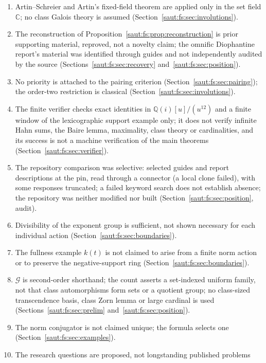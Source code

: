 \documentclass[11pt]{article}
\theoremstyle{definition}
\theoremstyle{remark}
\newcommand{\C}{\mathbb C}
\newcommand{\Q}{\mathbb Q}
\numberwithin{equation}{section}
\begin{document}
\begin{enumerate}[label=\arabic*.,leftmargin=2.2em]
field only for Archimedean coefficients; Proposition~\ref{saut:fs:prop:residue} is not
stated in general (Section~\ref{saut:fs:sec:integerparts}).
\item Artin--Schreier and Artin's fixed-field theorem are applied only in the set field
$\C$; no class Galois theory is assumed (Section~\ref{saut:fs:sec:involutions}).
\item The reconstruction of Proposition~\ref{saut:fs:prop:reconstruction} is prior
supporting material, reproved, not a novelty claim; the omnific Diophantine report's
material was identified through guides and not independently audited by the source
(Sections~\ref{saut:fs:sec:recovery} and~\ref{saut:fs:sec:position}).
\item No priority is attached to the pairing criterion
(Section~\ref{saut:fs:sec:pairing}); the order-two restriction is classical
(Section~\ref{saut:fs:sec:involutions}).
\item The finite verifier checks exact identities in $\Q(i)[u]/(u^{12})$ and a finite
window of the lexicographic support example only; it does not verify infinite Hahn
sums, the Baire lemma, maximality, class theory or cardinalities, and its success is
not a machine verification of the main theorems (Section~\ref{saut:fs:sec:verifier}).
\item The repository comparison was selective: selected guides and report
descriptions at the pin, read through a connector (a local clone failed), with some
responses truncated; a failed keyword search does not establish absence; the
repository was neither modified nor built (Section~\ref{saut:fs:sec:position}, audit).
\item Divisibility of the exponent group is sufficient, not shown necessary for each
individual action (Section~\ref{saut:fs:sec:boundaries}).
\item The fullness example $k(t)$ is not claimed to arise from a finite norm action or
to preserve the negative-support ring (Section~\ref{saut:fs:sec:boundaries}).
\item $\mathcal G$ is second-order shorthand; the count asserts a set-indexed uniform
family, not that class automorphisms form sets or a quotient group; no class-sized
transcendence basis, class Zorn lemma or large cardinal is used
(Sections~\ref{saut:fs:sec:prelim} and~\ref{saut:fs:sec:position}).
\item The norm conjugator is not claimed unique; the formula selects one
(Section~\ref{saut:fs:sec:examples}).
\item The research questions are proposed, not longstanding published problems

\end{enumerate}
\end{document}

